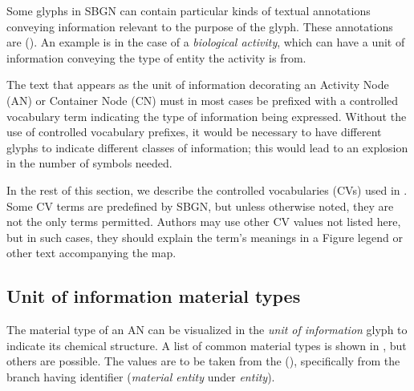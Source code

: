 
\normalcolor

Some glyphs in SBGN \AF can contain particular kinds of textual annotations conveying information relevant to the purpose of the glyph.  These annotations are  ().  An example is in the case of a \emph{biological activity}, which can have a unit of information conveying the type of entity the activity is from.

The text that appears as the unit of information decorating an Activity Node (AN) or Container Node (CN) must in most cases be prefixed with a controlled vocabulary term indicating the type of information being expressed. Without the use of controlled vocabulary prefixes, it would be necessary to have different glyphs to indicate different classes of information; this would lead to an explosion in the number of symbols needed. 

In the rest of this section, we describe the controlled vocabularies (CVs) used in \SBGNAFLone. Some CV terms are predefined by SBGN, but unless otherwise noted, they are not the only terms permitted. Authors may use other CV values not listed here, but in such cases, they should explain the term's meanings in a Figure legend or other text accompanying the map.

\subsection{Unit of information material types}
\label{sec:af:material-types-cv}

The material type of an AN can be visualized in the \emph{unit of information} glyph to indicate its chemical structure.  A list of common material types is shown in , but others are possible.  The values are to be taken from the \sbo (\sbourl), specifically from the branch having identifier  ($\!$\emph{material entity} under \emph{entity}).  

